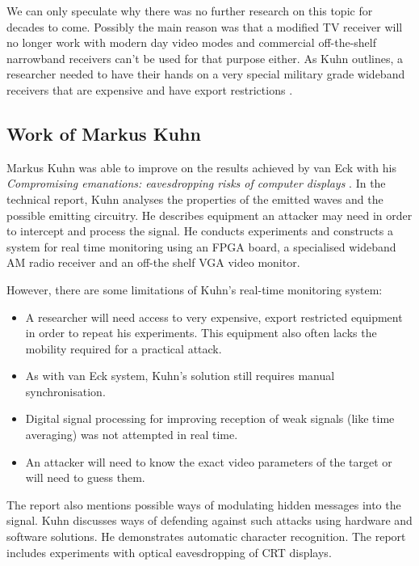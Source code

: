 \documentclass[a4paper,12pt,twoside,openright]{report}
\begin{document}
We can only speculate why there was no further research on this topic for decades to come. Possibly the main reason was that a modified TV receiver will no longer work with modern day video modes and commercial off-the-shelf narrowband receivers can't be used for that purpose either. As Kuhn outlines, a researcher needed to have their hands on a very special military grade wideband receivers that are expensive and have export restrictions \cite{kuhn2003compromising}.
 
\subsection{Work of Markus Kuhn}

Markus Kuhn was able to improve on the results achieved by van Eck with his \textit{Compromising emanations: eavesdropping risks of computer displays} \cite{kuhn2003compromising}. In the technical report, Kuhn analyses the properties of the emitted waves and the possible emitting circuitry. He describes equipment an attacker may need in order to intercept and process the signal. He conducts experiments and constructs a system for real time monitoring using an FPGA board, a specialised wideband AM radio receiver and an off-the shelf VGA video monitor. 

However, there are some limitations of Kuhn's real-time monitoring system:

\begin{itemize}

  \item A researcher will need access to very expensive, export restricted equipment in order to repeat his experiments. This equipment also often lacks the mobility required for a practical attack.
  \item As with van Eck system, Kuhn's solution still requires manual synchronisation.
  \item Digital signal processing for improving reception of weak signals (like time averaging) was not attempted in real time.
  \item An attacker will need to know the exact video parameters of the target or will need to guess them.

\end{itemize}

The report also mentions possible ways of modulating hidden messages into the signal. Kuhn discusses ways of defending against such attacks using hardware and software solutions. He demonstrates automatic character recognition. The report includes experiments with optical eavesdropping of CRT displays.
\end{document}
